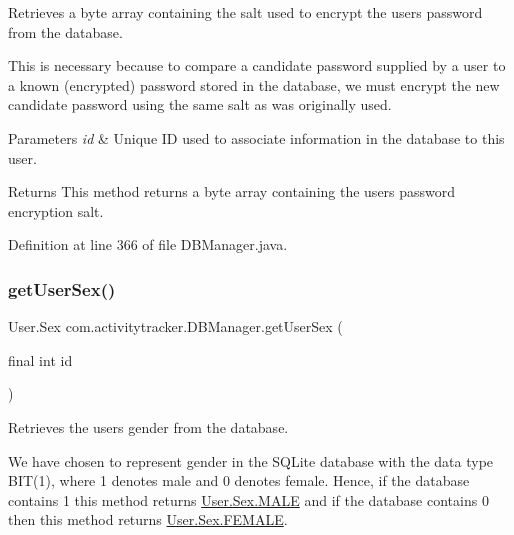 Retrieves a byte array containing the salt used to encrypt the user\textquotesingle{}s password from the database.

This is necessary because to compare a candidate password supplied by a user to a known (encrypted) password stored in the database, we must encrypt the new candidate password using the same salt as was originally used.


\begin{DoxyParams}{Parameters}
{\em id} & Unique ID used to associate information in the database to this user.\\
\hline
\end{DoxyParams}
\begin{DoxyReturn}{Returns}
This method returns a byte array containing the user\textquotesingle{}s password encryption salt. 
\end{DoxyReturn}


Definition at line 366 of file D\+B\+Manager.\+java.

\mbox{\label{classcom_1_1activitytracker_1_1_d_b_manager_a4e695c111b877cfd1d918602551f65a1}} 
\subsubsection{\texorpdfstring{get\+User\+Sex()}{getUserSex()}}
{\footnotesize\ttfamily User.\+Sex com.\+activitytracker.\+D\+B\+Manager.\+get\+User\+Sex (\begin{DoxyParamCaption}\item[{final int}]{id }\end{DoxyParamCaption})}

Retrieves the user\textquotesingle{}s gender from the database.

We have chosen to represent gender in the S\+Q\+Lite database with the data type B\+IT(1), where 1 denotes male and 0 denotes female. Hence, if the database contains 1 this method returns \mbox{\hyperlink{enumcom_1_1activitytracker_1_1_user_1_1_sex_ad3b626a38bd4615eb621d75b939f412d}{User.\+Sex.\+M\+A\+LE}} and if the database contains 0 then this method returns \mbox{\hyperlink{enumcom_1_1activitytracker_1_1_user_1_1_sex_a5c22ece8a4df71ed5202cd492990a752}{User.\+Sex.\+F\+E\+M\+A\+LE}}.

